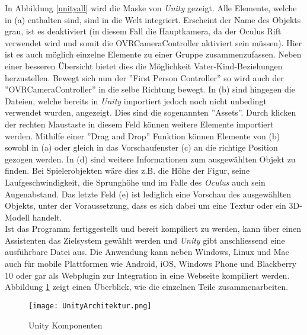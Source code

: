  In Abbildung \ref{unityall} wird die Maske von \textit{Unity} gezeigt. Alle Elemente, welche in (a) enthalten sind, sind in die Welt integriert. Erscheint der Name des Objekts grau, ist es deaktiviert (in diesem Fall die Hauptkamera, da der Oculus Rift verwendet wird und somit die OVRCameraController aktiviert sein müssen). Hier ist es auch möglich einzelne Elemente zu einer Gruppe zusammenzufassen. Neben einer besseren Übersicht bietet dies die Möglichkeit Vater-Kind-Beziehungen herzustellen. Bewegt sich nun der ''First Person Controller'' so wird auch der ''OVRCameraController'' in die selbe Richtung bewegt. In (b) sind hingegen die Dateien, welche bereits in \textit{Unity} importiert jedoch noch nicht unbedingt verwendet wurden, angezeigt. Dies sind die sogenannten ''Assets''. Durch klicken der rechten Maustaste in diesem Feld können weitere Elemente importiert werden. Mithilfe einer ''Drag and Drop'' Funktion können Elemente von (b) sowohl in (a) oder gleich in das Vorschaufenster (c) an die richtige Position gezogen werden. In (d) sind weitere Informationen zum ausgewählten Objekt zu finden. Bei Spielerobjekten wäre dies z.B. die Höhe der Figur, seine Laufgeschwindigkeit, die Sprunghöhe und im Falle des \textit{Oculus} auch sein Augenabstand. Das letzte Feld (e) ist lediglich eine Vorschau des ausgewählten Objekts, unter der Voraussetzung, dass es sich dabei um eine Textur oder ein 3D-Modell handelt.\\[6pt]
 Ist das Programm fertiggestellt und bereit kompiliert zu werden, kann über einen Assistenten das Zielsystem gewählt werden und \textit{Unity} gibt anschliessend eine ausführbare Datei aus. Die Anwendung kann neben Windows, Linux und Mac auch für mobile Plattformen wie Android, iOS, Windows Phone und Blackberry 10 oder gar als Webplugin zur Integration in eine Webseite kompiliert werden. Abbildung \ref{UnityArchitektur} zeigt einen Überblick, wie die einzelnen Teile zusammenarbeiten.\\[6pt]

 \begin{figure}[ht]
 	\vspace{-15pt}
 	\begin{center}
 		\texttt{[image: UnityArchitektur.png]}
 	\end{center}
 	\vspace{-15pt}
 	\caption{Unity Komponenten}\label{UnityArchitektur}
 	\vspace{-12pt}
 \end{figure}  
 

